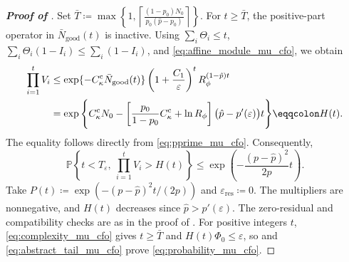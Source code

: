 \documentclass{article}
\begin{document}
\begin{proof}[\textbf{Proof of }]
Set
$\bar T
\coloneqq \max\left\{1,
\left\lceil
\frac{(1-p_0)N_0}{p_0(\hat p-p_0)}
\right\rceil\right\}$. For \(t\ge\bar T\), the positive-part
operator in \(\bar N_{\mathrm{good}}(t)\) is inactive. Using
\(\sum_i\Theta_i\le t\),
\(\sum_i\Theta_i(1-I_i)\le\sum_i(1-I_i)\), and
\eqref{eq:affine_module_mu_cfo}, we obtain
\begin{align}
\prod_{i=1}^tV_i
&\le
\exp\{-C_\kappa^{\mathrm{c}}\bar N_{\mathrm{good}}(t)\}
\left(1+\frac{C_1}{\varepsilon}\right)^t
R_\phi^{(1-\hat p)t}\notag\\
&=
\exp\Bigg\{
C_\kappa^{\mathrm{c}}N_0
-
\left[
\frac{p_0}{1-p_0}C_\kappa^{\mathrm{c}}
+\ln R_\phi
\right]
\bigl(\hat p-p'(\varepsilon)\bigr)t
\Bigg\}
\eqqcolon H(t).
\label{eq:product_mu_cfo}
\end{align}
The equality follows directly from \eqref{eq:pprime_mu_cfo}.
Consequently,
\begin{equation}\label{eq:abstract_tail_mu_cfo}
\mathbb P\left\{
 t<T_\varepsilon,\
 \prod_{i=1}^tV_i>H(t)
\right\}
\le
\exp\left(-\frac{(p-\hat p)^2}{2p}t\right).
\end{equation}
Take \(P(t)\coloneqq\exp(-(p-\hat p)^2t/(2p))\) and
\(\varepsilon_{\mathrm{res}}\coloneqq0\).
The multipliers are nonnegative, and \(H(t)\) decreases since
\(\hat p>p'(\varepsilon)\). The zero-residual and compatibility
checks are as in the proof of .
For positive integers \(t\), \eqref{eq:complexity_mu_cfo} gives
\(t\ge\bar T\) and \(H(t)\Phi_0\le\varepsilon\), so
 and \eqref{eq:abstract_tail_mu_cfo} prove
\eqref{eq:probability_mu_cfo}.
\end{proof}
\end{document}
